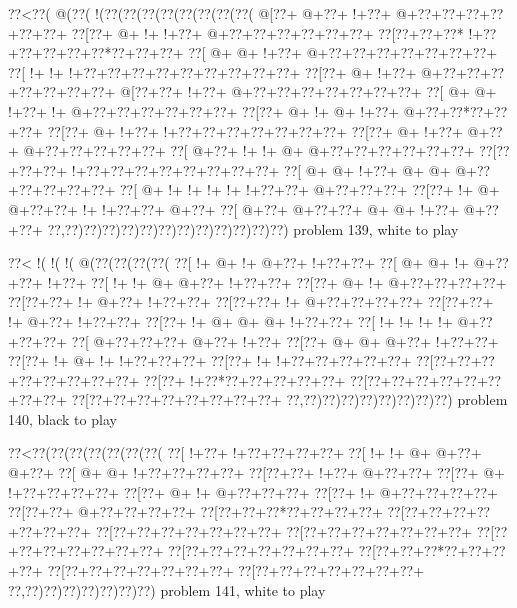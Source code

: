 \vbox{\vbox{\goo
\0??<\0??(\- @(\0??(\- !(\0??(\0??(\0??(\0??(\0??(\0??(\0??(\0??(
\- @[\0??+\- @+\0??+\- !+\0??+\- @+\0??+\0??+\0??+\0??+\0??+\0??+
\0??[\0??+\- @+\- !+\- !+\0??+\- @+\0??+\0??+\0??+\0??+\0??+\0??+
\0??[\0??+\0??+\0??*\- !+\0??+\0??+\0??+\0??+\0??*\0??+\0??+\0??+
\0??[\- @+\- @+\- !+\0??+\- @+\0??+\0??+\0??+\0??+\0??+\0??+\0??+
\0??[\- !+\- !+\- !+\0??+\0??+\0??+\0??+\0??+\0??+\0??+\0??+\0??+
\0??[\0??+\- @+\- !+\0??+\- @+\0??+\0??+\0??+\0??+\0??+\0??+\0??+
\- @[\0??+\0??+\- !+\0??+\- @+\0??+\0??+\0??+\0??+\0??+\0??+\0??+
\0??[\- @+\- @+\- !+\0??+\- !+\- @+\0??+\0??+\0??+\0??+\0??+\0??+
\0??[\0??+\- @+\- !+\- @+\- !+\0??+\- @+\0??+\0??*\0??+\0??+\0??+
\0??[\0??+\- @+\- !+\0??+\- !+\0??+\0??+\0??+\0??+\0??+\0??+\0??+
\0??[\0??+\- @+\- !+\0??+\- @+\0??+\- @+\0??+\0??+\0??+\0??+\0??+
\0??[\- @+\0??+\- !+\- !+\- @+\- @+\0??+\0??+\0??+\0??+\0??+\0??+
\0??[\0??+\0??+\0??+\- !+\0??+\0??+\0??+\0??+\0??+\0??+\0??+\0??+
\0??[\- @+\- @+\- !+\0??+\- @+\- @+\- @+\0??+\0??+\0??+\0??+\0??+
\0??[\- @+\- !+\- !+\- !+\- !+\- !+\0??+\0??+\- @+\0??+\0??+\0??+
\0??[\0??+\- !+\- @+\- @+\0??+\0??+\- !+\- !+\0??+\0??+\- @+\0??+
\0??[\- @+\0??+\- @+\0??+\0??+\- @+\- @+\- !+\0??+\- @+\0??+\0??+
\0??,\0??)\0??)\0??)\0??)\0??)\0??)\0??)\0??)\0??)\0??)\0??)\0??)
}
\hfil problem 139, white to play\hfil\break
}

\vbox{\vbox{\goo
\0??<\- !(\- !(\- !(\- @(\0??(\0??(\0??(\0??(
\0??[\- !+\- @+\- !+\- @+\0??+\- !+\0??+\0??+
\0??[\- @+\- @+\- !+\- @+\0??+\0??+\- !+\0??+
\0??[\- !+\- !+\- @+\- @+\0??+\- !+\0??+\0??+
\0??[\0??+\- @+\- !+\- @+\0??+\0??+\0??+\0??+
\0??[\0??+\0??+\- !+\- @+\0??+\- !+\0??+\0??+
\0??[\0??+\0??+\- !+\- @+\0??+\0??+\0??+\0??+
\0??[\0??+\0??+\- !+\- @+\0??+\- !+\0??+\0??+
\0??[\0??+\- !+\- @+\- @+\- @+\- !+\0??+\0??+
\0??[\- !+\- !+\- !+\- !+\- @+\0??+\0??+\0??+
\0??[\- @+\0??+\0??+\0??+\- @+\0??+\- !+\0??+
\0??[\0??+\- @+\- @+\- @+\0??+\- !+\0??+\0??+
\0??[\0??+\- !+\- @+\- !+\- !+\0??+\0??+\0??+
\0??[\0??+\- !+\- !+\0??+\0??+\0??+\0??+\0??+
\0??[\0??+\0??+\0??+\0??+\0??+\0??+\0??+\0??+
\0??[\0??+\- !+\0??*\0??+\0??+\0??+\0??+\0??+
\0??[\0??+\0??+\0??+\0??+\0??+\0??+\0??+\0??+
\0??[\0??+\0??+\0??+\0??+\0??+\0??+\0??+\0??+
\0??,\0??)\0??)\0??)\0??)\0??)\0??)\0??)\0??)
}
\hfil problem 140, black to play\hfil\break
}

\vbox{\vbox{\goo
\0??<\0??(\0??(\0??(\0??(\0??(\0??(\0??(
\0??[\- !+\0??+\- !+\0??+\0??+\0??+\0??+
\0??[\- !+\- !+\- @+\- @+\0??+\- @+\0??+
\0??[\- @+\- @+\- !+\0??+\0??+\0??+\0??+
\0??[\0??+\0??+\- !+\0??+\- @+\0??+\0??+
\0??[\0??+\- @+\- !+\0??+\0??+\0??+\0??+
\0??[\0??+\- @+\- !+\- @+\0??+\0??+\0??+
\0??[\0??+\- !+\- @+\0??+\0??+\0??+\0??+
\0??[\0??+\0??+\- @+\0??+\0??+\0??+\0??+
\0??[\0??+\0??+\0??*\0??+\0??+\0??+\0??+
\0??[\0??+\0??+\0??+\0??+\0??+\0??+\0??+
\0??[\0??+\0??+\0??+\0??+\0??+\0??+\0??+
\0??[\0??+\0??+\0??+\0??+\0??+\0??+\0??+
\0??[\0??+\0??+\0??+\0??+\0??+\0??+\0??+
\0??[\0??+\0??+\0??+\0??+\0??+\0??+\0??+
\0??[\0??+\0??+\0??*\0??+\0??+\0??+\0??+
\0??[\0??+\0??+\0??+\0??+\0??+\0??+\0??+
\0??[\0??+\0??+\0??+\0??+\0??+\0??+\0??+
\0??,\0??)\0??)\0??)\0??)\0??)\0??)\0??)
}
\hfil problem 141, white to play\hfil\break
}

